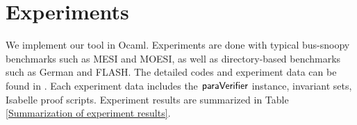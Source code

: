 \documentclass[final]{IEEEtran}
\begin{document}
\section{Experiments}\label{sec:experiments}
We implement our tool in Ocaml. %
 Experiments are
done with typical bus-snoopy benchmarks such as MESI and MOESI, as well as
 directory-based benchmarks such as  German and FLASH. The detailed codes and experiment data can
be found in \cite{LiCache16}. Each experiment data includes the
${\sf paraVerifier}$ instance, invariant sets, Isabelle proof
scripts.  Experiment results are summarized in Table \ref{Summarization of experiment results}.


\end{document}
